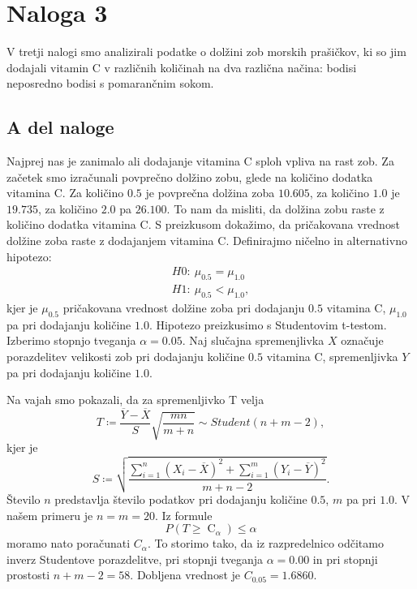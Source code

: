 \documentclass{article}
\DeclareMathOperator{\CM}{C}
\begin{document}
\section{Naloga 3}
V tretji nalogi smo analizirali
podatke o dolžini zob morskih prašičkov, ki so jim
dodajali vitamin C v različnih količinah na dva različna načina: bodisi neposredno
bodisi s pomarančnim sokom.

\subsection{A del naloge}
Najprej nas je zanimalo ali dodajanje vitamina C sploh vpliva na rast zob. Za začetek smo izračunali
povprečno dolžino zobu, glede na količino dodatka vitamina C. Za količino $0.5$ je povprečna dolžina zoba
$10.605$, za količino $1.0$ je $19.735$, za količino $2.0$ pa $26.100$. To nam da misliti, da dolžina zobu raste 
z količino dodatka vitamina C.
S preizkusom dokažimo, da pričakovana vrednost dolžine zoba raste z dodajanjem vitamina C.
Definirajmo ničelno in alternativno
hipotezo:
\begin{align}
    H0: \ \mu_{0.5} = \mu_{1.0} \\
    H1: \ \mu_{0.5} < \mu_{1.0},
\end{align}
kjer je $\mu_{0.5}$ pričakovana vrednost dolžine zoba pri dodajanju $0.5$ vitamina C, 
$\mu_{1.0}$ pa pri dodajanju količine $1.0$.
Hipotezo preizkusimo s Studentovim t-testom. 
Izberimo stopnjo tveganja $\alpha=0.05$.
Naj slučajna spremenjlivka $X$ označuje porazdelitev velikosti zob pri dodajanju količine $0.5$ vitamina C,
spremenljivka $Y$ pa pri dodajanju količine $1.0$. 

Na vajah smo pokazali, da za spremenljivko T velja
    \[
        T \coloneqq \frac{\overline{Y} - \overline{X}}{S}\sqrt{\frac{mn}{m + n}} \sim Student(n + m - 2),
    \]
    kjer je
    \[
        S \coloneqq \sqrt{\frac{\sum_{i = 1}^n (X_{i} - \overline{X})^2 + \sum_{i = 1}^m (Y_{i} - \overline{Y})^2}{m + n - 2}}.
    \]
Število $n$ predstavlja število podatkov pri dodajanju količine $0.5$, $m$ pa pri $1.0$. V našem primeru je $n=m=20$.
Iz formule
\[
        P(T \geq \CM_{\alpha}) \leq \alpha 
    \]
moramo nato poračunati $C_{\alpha}$. To storimo tako, da iz razpredelnico odčitamo inverz Studentove porazdelitve,
pri stopnji tveganja $\alpha = 0.00$ in pri stopnji prostosti $n + m -2 = 58$.
Dobljena vrednost je $C_{0.05} = 1.6860$.
\end{document}
